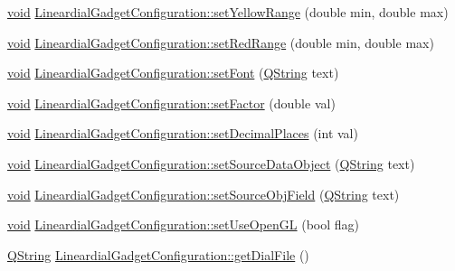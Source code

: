 \begin{DoxyCompactItemize}
\hyperlink{group___u_a_v_objects_plugin_ga444cf2ff3f0ecbe028adce838d373f5c}{void} \hyperlink{group___linear_dial_plugin_gae1437ef9469c5a813ad0c76f04b186d2}{\-Lineardial\-Gadget\-Configuration\-::set\-Yellow\-Range} (double min, double max)
\item 
\hyperlink{group___u_a_v_objects_plugin_ga444cf2ff3f0ecbe028adce838d373f5c}{void} \hyperlink{group___linear_dial_plugin_gab1a3bcf875948fdb2203a511b7245e36}{\-Lineardial\-Gadget\-Configuration\-::set\-Red\-Range} (double min, double max)
\item 
\hyperlink{group___u_a_v_objects_plugin_ga444cf2ff3f0ecbe028adce838d373f5c}{void} \hyperlink{group___linear_dial_plugin_ga1aedc8fa6dded9d30aacde381e4b068a}{\-Lineardial\-Gadget\-Configuration\-::set\-Font} (\hyperlink{group___u_a_v_objects_plugin_gab9d252f49c333c94a72f97ce3105a32d}{\-Q\-String} text)
\item 
\hyperlink{group___u_a_v_objects_plugin_ga444cf2ff3f0ecbe028adce838d373f5c}{void} \hyperlink{group___linear_dial_plugin_ga59dcd0145c59b1e63f4f004d1b8cc22a}{\-Lineardial\-Gadget\-Configuration\-::set\-Factor} (double val)
\item 
\hyperlink{group___u_a_v_objects_plugin_ga444cf2ff3f0ecbe028adce838d373f5c}{void} \hyperlink{group___linear_dial_plugin_gac027133a81aa51ae990681d8ece122e6}{\-Lineardial\-Gadget\-Configuration\-::set\-Decimal\-Places} (int val)
\item 
\hyperlink{group___u_a_v_objects_plugin_ga444cf2ff3f0ecbe028adce838d373f5c}{void} \hyperlink{group___linear_dial_plugin_gab0e129448ff276e38c2fc87cb8883e62}{\-Lineardial\-Gadget\-Configuration\-::set\-Source\-Data\-Object} (\hyperlink{group___u_a_v_objects_plugin_gab9d252f49c333c94a72f97ce3105a32d}{\-Q\-String} text)
\item 
\hyperlink{group___u_a_v_objects_plugin_ga444cf2ff3f0ecbe028adce838d373f5c}{void} \hyperlink{group___linear_dial_plugin_gace43fd36313161f4a963e2b95a445354}{\-Lineardial\-Gadget\-Configuration\-::set\-Source\-Obj\-Field} (\hyperlink{group___u_a_v_objects_plugin_gab9d252f49c333c94a72f97ce3105a32d}{\-Q\-String} text)
\item 
\hyperlink{group___u_a_v_objects_plugin_ga444cf2ff3f0ecbe028adce838d373f5c}{void} \hyperlink{group___linear_dial_plugin_ga3834f5a345c01cce74297c2a65a82523}{\-Lineardial\-Gadget\-Configuration\-::set\-Use\-Open\-G\-L} (bool flag)
\item 
\hyperlink{group___u_a_v_objects_plugin_gab9d252f49c333c94a72f97ce3105a32d}{\-Q\-String} \hyperlink{group___linear_dial_plugin_ga44cbe980684b267ae41060c0428e00ce}{\-Lineardial\-Gadget\-Configuration\-::get\-Dial\-File} ()

\end{DoxyCompactItemize}
